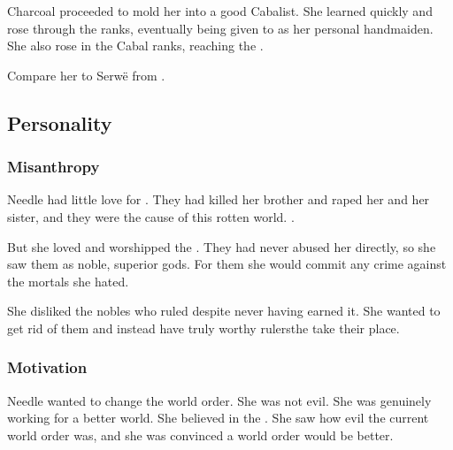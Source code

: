 Charcoal proceeded to mold her into a good Cabalist. 
She learned quickly and rose through the ranks, eventually being given to \Tiroco{} as her personal handmaiden. 
She also rose in the Cabal ranks, reaching the \needlecircle. 

Compare her to Serw\"e from . 










\subsection{Personality}





\subsubsection{Misanthropy}
Needle had little love for \humans{}. 
They had killed her brother and raped her and her sister, and they were the cause of this rotten world. 
\Scathae{} . 

But she loved and worshipped the \resphain. 
They had never abused her directly, so she saw them as noble, superior gods. 
For them she would commit any crime against the mortals she hated. 

She disliked the nobles who ruled \Miith{} despite never having earned it. 
She wanted to get rid of them and instead have truly worthy rulers\dash the \resphain{}\dash take their place. 





\subsubsection{Motivation}
Needle wanted to change the world order. 
She was not evil. 
She was genuinely working for a better world. 
She believed in the \resphain.
She saw how evil the current world order was, and she was convinced a \resphan world order would be better. 

